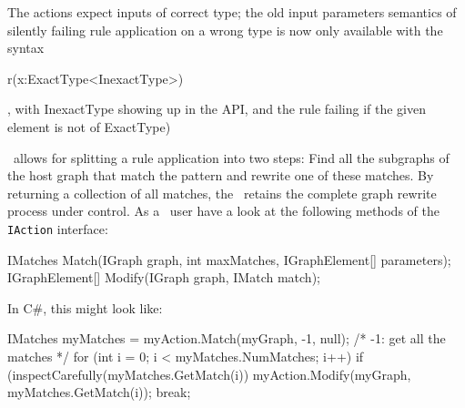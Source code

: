 The actions expect inputs of correct type; the old input parameters semantics
of silently failing rule application on a wrong type is now only available 
with the syntax \begin{grgenlet}r(x:ExactType<InexactType>)\end{grgenlet}, with InexactType showing up in the API,
and the rule failing if the given element is not of ExactType)

\LibGr\ allows for splitting a rule application into two steps: Find all the subgraphs of the host graph that match the pattern and rewrite one of these matches. 
By returning a collection of all matches, the \LibGr\ retains the complete graph rewrite process under control.
As a \LibGr\ user have a look at the following methods of the \texttt{IAction} interface:
\begin{csharplet}
IMatches Match(IGraph graph, int maxMatches, IGraphElement[] parameters);
IGraphElement[] Modify(IGraph graph, IMatch match);
\end{csharplet}
In C\#, this might look like:
\begin{csharplet}
IMatches myMatches = myAction.Match(myGraph, -1, null); /* -1: get all the matches */
for (int i = 0; i < myMatches.NumMatches; i++)
{
	if (inspectCarefully(myMatches.GetMatch(i))
	{
		myAction.Modify(myGraph, myMatches.GetMatch(i));
		break;
  	}
}
\end{csharplet}


